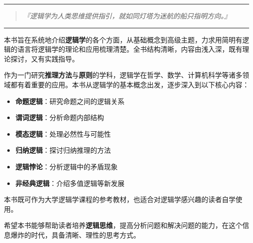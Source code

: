 
\begin{center}
\rule{0.5\textwidth}{0.4pt}
\end{center}

\begin{quotation}
\large\textit{『逻辑学为人类思维提供指引，就如同灯塔为迷航的船只指明方向。』}
\end{quotation}

\begin{center}
\rule{0.5\textwidth}{0.4pt}
\end{center}

\vspace{1em}

本书旨在系统地介绍\textbf{逻辑学}的各个方面，从基础概念到高级主题，力求用简明有逻辑的语言将逻辑学的理论和应用梳理清楚。全书结构清晰，内容由浅入深，既有理论探讨，又有实践指导。

作为一门研究\textbf{推理方法}与\textbf{原则}的学科，逻辑学在哲学、数学、计算机科学等诸多领域都有着重要的应用。本书从逻辑学的基本概念出发，逐步深入到以下核心内容：

\begin{itemize}
  \item \textbf{命题逻辑}：研究命题之间的逻辑关系
  \item \textbf{谓词逻辑}：分析命题内部结构
  \item \textbf{模态逻辑}：处理必然性与可能性
  \item \textbf{归纳逻辑}：探讨归纳推理的方法
  \item \textbf{逻辑悖论}：分析逻辑中的矛盾现象
  \item \textbf{非经典逻辑}：介绍多值逻辑等新发展
\end{itemize}

本书既可作为大学逻辑学课程的参考教材，也适合对逻辑学感兴趣的读者自学使用。

\begin{center}
\end{center}

\vspace{1em}

希望本书能够帮助读者培养\textbf{逻辑思维}，提高分析问题和解决问题的能力，在这个信息爆炸的时代，具备清晰、理性的思考方式。